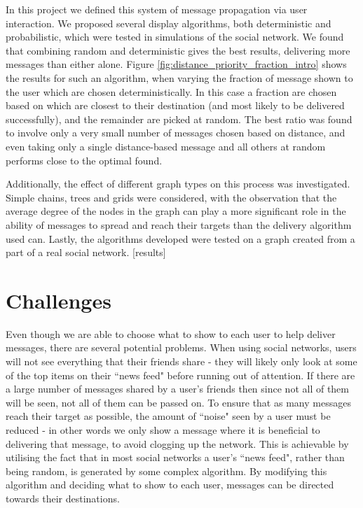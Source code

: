 \documentclass[bsc,frontabs,twoside,singlespacing,parskip,deptreport]{infthesis}     %
\begin{document}
In this project we defined this system of message propagation via user interaction. We proposed several display algorithms, both deterministic and probabilistic, which were tested in simulations of the social network. We found that combining random and deterministic gives the best results, delivering more messages than either alone. Figure \ref{fig:distance_priority_fraction_intro} shows the results for such an algorithm, when varying the fraction of message shown to the user which are chosen deterministically. In this case a fraction are chosen based on which are closest to their destination (and most likely to be delivered successfully), and the remainder are picked at random. The best ratio was found to involve only a very small number of messages chosen based on distance, and even taking only a single distance-based message and all others at random performs close to the optimal found.

Additionally, the effect of different graph types on this process was investigated. Simple chains, trees and grids were considered, with the observation that the average degree of the nodes in the graph can play a more significant role in the ability of messages to spread and reach their targets than the delivery algorithm used can. Lastly, the algorithms developed were tested on a graph created from a part of a real social network. [results]


\section{Challenges}
Even though we are able to choose what to show to each user to help deliver messages, there are several potential problems. When using social networks, users will not see everything that their friends share - they will likely only look at some of the top items on their ``news feed" before running out of attention. If there are a large number of messages shared by a user's friends then since not all of them will be seen, not all of them can be passed on. To ensure that as many messages reach their target as possible, the amount of ``noise" seen by a user must be reduced - in other words we only show a message  where it is beneficial to delivering that message, to avoid clogging up the network. This is achievable by utilising the fact that in most social networks a user's ``news feed", rather than being random, is generated by some complex algorithm. By modifying this algorithm and deciding what to show to each user, messages can be directed towards their destinations.
\end{document}
